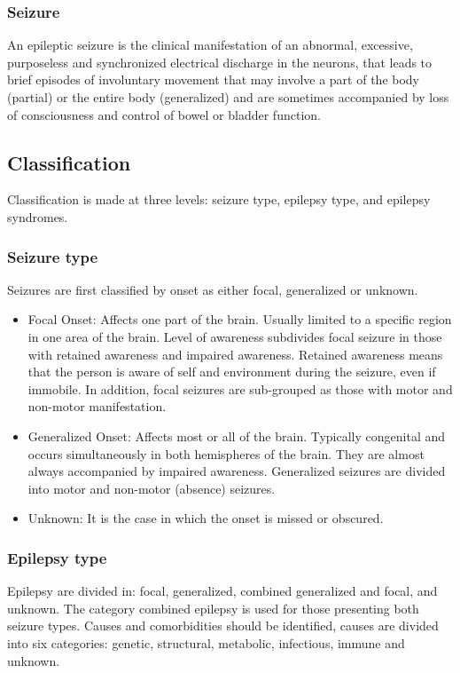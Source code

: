 \documentclass{EPL-master-thesis-covers-EN}
\begin{document}
    \subsubsection*{Seizure}
    An epileptic seizure is the clinical manifestation of an abnormal, excessive, purposeless and synchronized electrical discharge in the neurons, that leads to brief episodes of involuntary movement that may involve a part of the body (partial) or the entire body (generalized) and are sometimes accompanied by loss of consciousness and control of bowel or bladder function. \cite{WHO}
    
    \subsection{Classification}
    Classification is made at three levels: seizure type, epilepsy type, and epilepsy syndromes. \cite{classification}
    \subsubsection*{Seizure type}
    Seizures are first classified by onset as either focal, generalized or unknown.
    \begin{itemize}
      \item Focal Onset: Affects one part of the brain. Usually limited to a specific region in one area of the brain. Level of awareness subdivides focal seizure in those with retained awareness and impaired awareness. Retained awareness means that the person is aware of self and environment during the seizure, even if immobile. In addition, focal seizures are sub-grouped as those with motor and non-motor manifestation.
      \item Generalized Onset: Affects most or all of the brain. Typically congenital and occurs simultaneously in both hemispheres of the brain. They are almost always accompanied by impaired awareness. Generalized seizures are divided into motor and non-motor (absence) seizures.
      \item Unknown: It is the case in which the onset is missed or obscured. 
    \end{itemize}
    
    \subsubsection*{Epilepsy type}
    Epilepsy are divided in: focal, generalized, combined generalized and focal, and unknown. The category combined epilepsy is used for those presenting both seizure types. Causes and comorbidities should be identified, causes are divided into six categories: genetic, structural, metabolic, infectious, immune and unknown.
  
\end{document}
